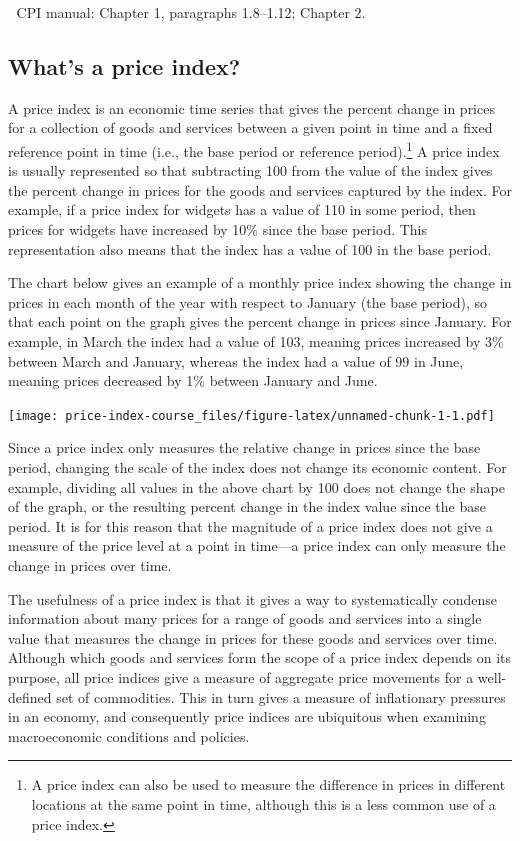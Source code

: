 \documentclass[
]{article}
\begin{document}
📖 CPI manual: Chapter 1, paragraphs 1.8--1.12; Chapter 2.

\hypertarget{whats-a-price-index}{%
\subsection{What's a price index?}\label{whats-a-price-index}}

A price index is an economic time series that gives the percent change in prices for a collection of goods and services between a given point in time and a fixed reference point in time (i.e., the base period or reference period).\footnote{A price index can also be used to measure the difference in prices in different locations at the same point in time, although this is a less common use of a price index.} A price index is usually represented so that subtracting 100 from the value of the index gives the percent change in prices for the goods and services captured by the index. For example, if a price index for widgets has a value of 110 in some period, then prices for widgets have increased by 10\% since the base period. This representation also means that the index has a value of 100 in the base period.

The chart below gives an example of a monthly price index showing the change in prices in each month of the year with respect to January (the base period), so that each point on the graph gives the percent change in prices since January. For example, in March the index had a value of 103, meaning prices increased by 3\% between March and January, whereas the index had a value of 99 in June, meaning prices decreased by 1\% between January and June.

\texttt{[image: price-index-course\_files/figure-latex/unnamed-chunk-1-1.pdf]}

Since a price index only measures the relative change in prices since the base period, changing the scale of the index does not change its economic content. For example, dividing all values in the above chart by 100 does not change the shape of the graph, or the resulting percent change in the index value since the base period. It is for this reason that the magnitude of a price index does not give a measure of the price level at a point in time---a price index can only measure the change in prices over time.

The usefulness of a price index is that it gives a way to systematically condense information about many prices for a range of goods and services into a single value that measures the change in prices for these goods and services over time. Although which goods and services form the scope of a price index depends on its purpose, all price indices give a measure of aggregate price movements for a well-defined set of commodities. This in turn gives a measure of inflationary pressures in an economy, and consequently price indices are ubiquitous when examining macroeconomic conditions and policies.
\end{document}
